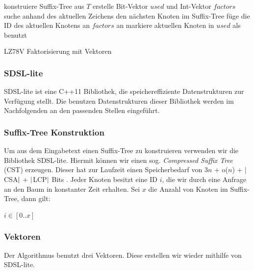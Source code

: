\documentclass[a4paper,11pt]{scrartcl}%
\theoremstyle{change}
\theoremstyle{nonumberplain}
\theoremstyle{change}
\theoremstyle{nonumberplain}
\theoremstyle{change}
\theoremstyle{nonumberplain}
\begin{document}
\begin{algorithm}[t]
	\SetAlgoLined
	
	konstruiere Suffix-Tree aus $T$\;
	erstelle Bit-Vektor $used$ und Int-Vektor $factors$\;
	 {
		suche anhand des aktuellen Zeichens den nächsten Knoten im Suffix-Tree\;\label{line:child}
		 
		füge die ID des aktuellen Knotens an $factors$ an\;
		markiere aktuellen Knoten in $used$ als benutzt\;
	}
	
	\caption{LZ78V Faktorisierung mit Vektoren}
	\label{algo:factVec}
\end{algorithm}
\newpage
\subsubsection{SDSL-lite}
SDSL-lite ist eine C++11 Bibliothek, die speichereffiziente Datenstrukturen zur Verfügung stellt. Die benutzen Datenstrukturen dieser Bibliothek werden im Nachfolgenden an den passenden Stellen eingeführt.\cite{sdsl}

\subsubsection{Suffix-Tree Konstruktion}

Um aus dem Eingabetext einen Suffix-Tree zu konstruieren verwenden wir die Bibliothek SDSL-lite. Hiermit können wir einen sog. \textit{Compressed Suffix Tree} (CST) erzeugen. Dieser hat zur Laufzeit einen Speicherbedarf von 3$n$ + o($n$) + $\arrowvert$CSA$\arrowvert$ + $\arrowvert$LCP$\arrowvert$ Bits .\cite{sdsl} Jeder Knoten besitzt eine ID $i$, die wir durch eine Anfrage an den Baum in konstanter Zeit erhalten.
Sei $x$ die Anzahl von Knoten im Suffix-Tree, dann gilt:
\begin{center}
	$i \in [0..x]$
\end{center}

\subsubsection{Vektoren}

Der Algorithmus benutzt drei Vektoren. Diese erstellen wir wieder mithilfe von SDSL-lite.
\end{document}
